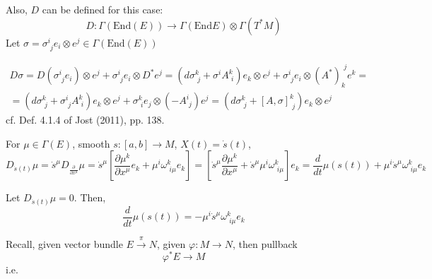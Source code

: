 \documentclass[10pt]{amsart}
\begin{document}
\begin{multicols*}{2}
Also, $D$ can be defined for this case:
\[
D: \Gamma (\text{End}(E)) \to \Gamma(\text{End}E) \otimes \Gamma(T^*M)
\]
Let $\sigma = \sigma^i_{ \,\, j} e_i \otimes e^j \in \Gamma(\text{End}(E))$

\begin{equation}
\begin{gathered}
	D\sigma = D(\sigma^i_{ \,\, j} e_i ) \otimes e^j + \sigma^i_{ \,\, j} e_i \otimes D^* e^j = \left( d\sigma^k_{ \,\, j} + \sigma^i A^k_{ \,\, i} \right) e_k \otimes e^j + \sigma^i_{ \,\, j} e_i \otimes (A^*)_k^{ \,\, j} e^k = \\
	= (d\sigma^k_{ \,\, j} + \sigma^i_{ \,\, j} A^k_{ \,\, i} ) e_k \otimes e^j + \sigma^k_{ \,\, i} e_j \otimes (- A^i_{ \, \, j}) e^j = (d\sigma^k_{ \,\, j} + [A,\sigma]^k_{ \,\, j}) e_k\otimes e^j
\end{gathered}
\end{equation}
cf. Def. 4.1.4 of Jost (2011), pp. 138.  

For $\mu \in \Gamma(E)$, smooth $s:[a,b] \to M$, $X(t) = \dot{s}(t)$,
\begin{equation}
D_{\dot{s}(t)}\mu = \dot{s}^{\mu}D_{\frac{ \partial }{ \partial x^{\mu}} } \mu = \dot{s}^{\mu} \left[ \frac{ \partial \mu^k }{ \partial x^{\mu}} e_k + \mu^i \omega^k_{ \, \, i\mu} e_k \right] = \left[ \dot{s}^{\mu} \frac{ \partial \mu^k}{ \partial x^{\mu} } + \dot{s}^{\mu} \mu^i \omega^k_{ \,\, i \mu} \right] e_k =\frac{d}{dt} \mu(s(t)) + \mu^i \dot{s}^{\mu} \omega^k_{ \,\, i \mu} e_k
\end{equation}

Let $D_{\dot{s}(t)}\mu=0$.  Then, 
\begin{equation}
\frac{d}{dt} \mu(s(t)) = -\mu^i \dot{s}^{\mu}\omega^k_{ \,\, i\mu} e_k
\end{equation}


Recall, given vector bundle $E\xrightarrow{ \pi} N$, given $\varphi : M\to N$, then pullback 
\begin{equation}
	\varphi^* E \to M
\end{equation}
i.e. 


\end{multicols*}
\end{document}
